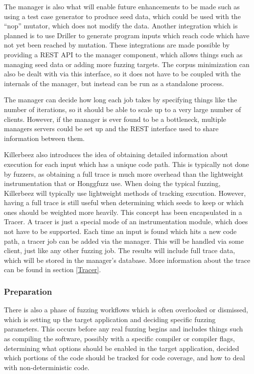 The manager is also what will enable future enhancements to be made such as
using a test case generator to produce seed data, which could be used with the
``nop'' mutator, which does not modify the data. Another integration which is
planned is to use Driller\cite{driller} to generate program inputs which reach
code which have not yet been reached by mutation. These integrations are made
possible by providing a REST API to the manager component, which allows things
such as managing seed data or adding more fuzzing targets. The corpus
minimization can also be dealt with via this interface, so it does not have to
be coupled with the internals of the manager, but instead can be run as a
standalone process.

The manager can decide how long each job takes by specifying things like the
number of iterations, so it should be able to scale up to a very large number
of clients.  However, if the manager is ever found to be a bottleneck, multiple
managers servers could be set up and the REST interface used to share
information between them.


Killerbeez also introduces the idea of obtaining detailed information about
execution for each input which has a unique code path.  This is typically
not done by fuzzers, as obtaining a full trace is much more overhead than
the lightweight instrumentation that \AFL{} or Honggfuzz use. When doing the
typical fuzzing, Killerbeez will typically use lightweight methods of tracking
execution. However, having a full trace is still useful when determining which
seeds to keep or which ones should be weighted more heavily. This concept has
been encapsulated in a Tracer. A tracer is just a special mode of an
instrumentation module, which does not have to be supported. Each time an input
is found which hits a new code path, a tracer job can be added via the manager.
This will be handled via some \BOINC{} client, just like any other fuzzing job.
The results will include full trace data, which will be stored in the manager's
database.  More information about the trace can be found in section
\ref{Tracer}.

\subsubsection{Preparation}  \label{Preparation Overview}
There is also a phase of fuzzing workflows which is often overlooked or
dismissed, which is setting up the target application and deciding specific
fuzzing parameters. This occurs before any real fuzzing begins and includes
things such as compiling the software, possibly with a specific compiler or
compiler flags, determining what options should be enabled in the target
application, decided which portions of the code should be tracked for code
coverage, and how to deal with non-deterministic code.

